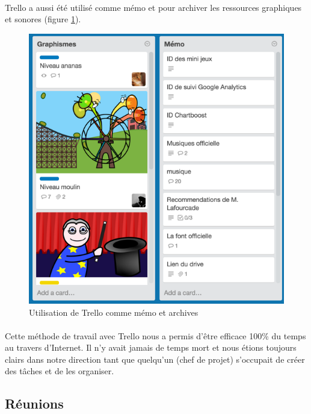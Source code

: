 \paragraph{}
Trello a aussi été utilisé comme mémo et pour archiver les ressources graphiques et sonores (figure \ref{trellomemo}).

\begin{figure}[H]\centering
  \includegraphics[scale=1]{./img/trello_autres.png}
  \caption{Utilisation de Trello comme mémo et archives}
  \label{trellomemo}
\end{figure}

\paragraph{}
Cette méthode de travail avec Trello nous a permis d’être efficace 100\% du temps au travers d'Internet. Il n’y avait jamais de temps mort et nous étions toujours clairs dans notre direction tant que quelqu’un (chef de projet) s’occupait de créer des tâches et de les organiser.

\subsection{Réunions}

